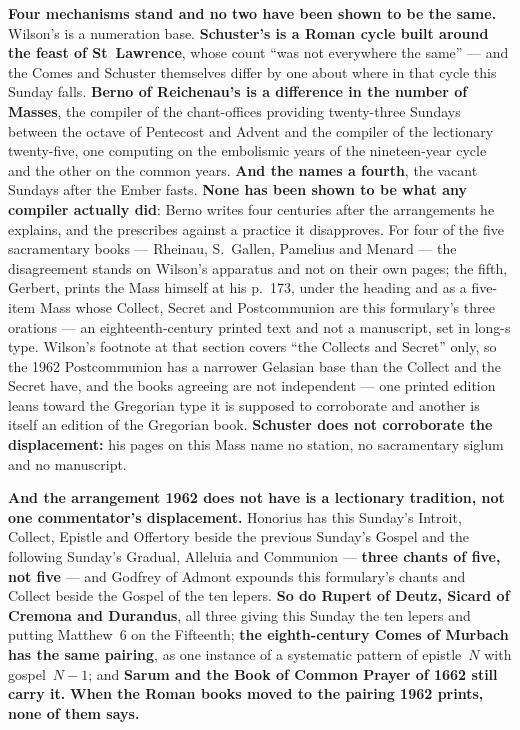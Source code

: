 \textbf{Four mechanisms stand and no two have been shown to be the same.}
Wilson's is a numeration base. \textbf{Schuster's is a Roman cycle built around
the feast of St~Lawrence}, whose count ``was not everywhere the same'' --- and
the Comes and Schuster themselves differ by one about where in that cycle this
Sunday falls. \textbf{Berno of Reichenau's is a difference in the number of
Masses}, the compiler of the chant-offices providing twenty-three Sundays
between the octave of Pentecost and Advent and the compiler of the lectionary
twenty-five, one computing on the embolismic years of the nineteen-year cycle
and the other on the common years. \textbf{And the  names a
fourth}, the vacant Sundays after the Ember fasts. \textbf{None has been shown
to be what any compiler actually did}: Berno writes four centuries after the
arrangements he explains, and the  prescribes against a
practice it disapproves.
For four of the five sacramentary books --- Rheinau, S.~Gallen, Pamelius and
Menard --- the disagreement stands on Wilson's apparatus and not on their own
pages; the fifth, Gerbert, prints the Mass himself at his p.~173, under the
heading  and as a five-item Mass whose
Collect, Secret and Postcommunion are this formulary's three orations --- an
eighteenth-century printed text and not a manuscript, set in long-s type. Wilson's footnote at that section covers ``the Collects and Secret''
only, so the 1962 Postcommunion has a narrower Gelasian base than the Collect
and the Secret have, and the books agreeing are not independent --- one printed edition leans toward
the Gregorian type it is supposed to corroborate and another is itself an
edition of the Gregorian book. \textbf{Schuster does not corroborate the
displacement:} his pages on this Mass name no station, no sacramentary siglum
and no manuscript.

\textbf{And the arrangement 1962 does not have is a lectionary tradition, not
one commentator's displacement.} Honorius has this Sunday's Introit, Collect,
Epistle and Offertory beside the previous Sunday's Gospel and the following
Sunday's Gradual, Alleluia and Communion --- \textbf{three chants of five, not
five} --- and Godfrey of Admont expounds this formulary's chants and Collect
beside the Gospel of the ten lepers. \textbf{So do Rupert of Deutz, Sicard of
Cremona and Durandus}, all three giving this Sunday the ten lepers and putting
Matthew~6 on the Fifteenth; \textbf{the eighth-century Comes of Murbach has the
same pairing}, as one instance of a systematic pattern of epistle~$N$ with
gospel~$N{-}1$; and \textbf{Sarum and the Book of Common Prayer of 1662 still
carry it.} \textbf{When the Roman books moved to the pairing 1962
prints, none of them says.}

